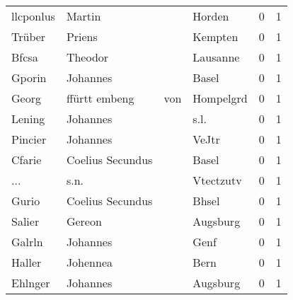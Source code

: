 \begin{center}
\begin{tiny}
\begin{longtabu}{llllrr}
                llcponlus &                             Martin &             &                                      Horden &          0 &         1 \\
                   Trüber &                             Priens &             &                                     Kempten &          0 &         1 \\
                    Bfcsa &                            Theodor &             &                                    Lausanne &          0 &         1 \\
                   Gporin &                           Johannes &             &                                       Basel &          0 &         1 \\
                    Georg &                      ffürtt embeng &         von &                                   Hompelgrd &          0 &         1 \\
                   Lening &                           Johannes &             &                                        s.l. &          0 &         1 \\
                  Pincier &                           Johannes &             &                                       VeJtr &          0 &         1 \\
                   Cfarie &                   Coelius Secundus &             &                                       Basel &          0 &         1 \\
                      ... &                               s.n. &             &                                   Vtectzutv &          0 &         1 \\
                    Gurio &                   Coelius Secundus &             &                                       Bhsel &          0 &         1 \\
                   Salier &                             Gereon &             &                                    Augsburg &          0 &         1 \\
                   Galrln &                           Johannes &             &                                        Genf &          0 &         1 \\
                   Haller &                           Johennea &             &                                        Bern &          0 &         1 \\
                  Ehlnger &                           Johannes &             &                                    Augsburg &          0 &         1 \\

\end{longtabu}
\end{tiny}
\end{center}

